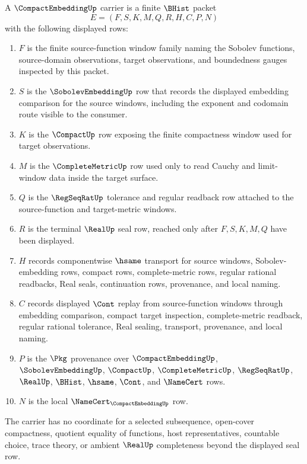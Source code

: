 \begin{definition}
\label{def:compact-embedding-carrier}
A $\CompactEmbeddingUp$ carrier is a finite $\BHist$ packet
$$
E=(F,S,K,M,Q,R,H,C,P,N)
$$
with the following displayed rows:
\begin{enumerate}
\item $F$ is the finite source-function window family naming the Sobolev functions, source-domain observations, target observations, and boundedness gauges inspected by this packet.
\item $S$ is the $\SobolevEmbeddingUp$ row that records the displayed embedding comparison for the source windows, including the exponent and codomain route visible to the consumer.
\item $K$ is the $\CompactUp$ row exposing the finite compactness window used for target observations.
\item $M$ is the $\CompleteMetricUp$ row used only to read Cauchy and limit-window data inside the target surface.
\item $Q$ is the $\RegSeqRatUp$ tolerance and regular readback row attached to the source-function and target-metric windows.
\item $R$ is the terminal $\RealUp$ seal row, reached only after $F,S,K,M,Q$ have been displayed.
\item $H$ records componentwise $\hsame$ transport for source windows, Sobolev-embedding rows, compact rows, complete-metric rows, regular rational readbacks, Real seals, continuation rows, provenance, and local naming.
\item $C$ records displayed $\Cont$ replay from source-function windows through embedding comparison, compact target inspection, complete-metric readback, regular rational tolerance, Real sealing, transport, provenance, and local naming.
\item $P$ is the $\Pkg$ provenance over $\CompactEmbeddingUp$, $\SobolevEmbeddingUp$, $\CompactUp$, $\CompleteMetricUp$, $\RegSeqRatUp$, $\RealUp$, $\BHist$, $\hsame$, $\Cont$, and $\NameCert$ rows.
\item $N$ is the local $\NameCert_{\CompactEmbeddingUp}$ row.
\end{enumerate}
The carrier has no coordinate for a selected subsequence, open-cover compactness, quotient equality of functions, host representatives, countable choice, trace theory, or ambient $\RealUp$ completeness beyond the displayed seal row.
\end{definition}

